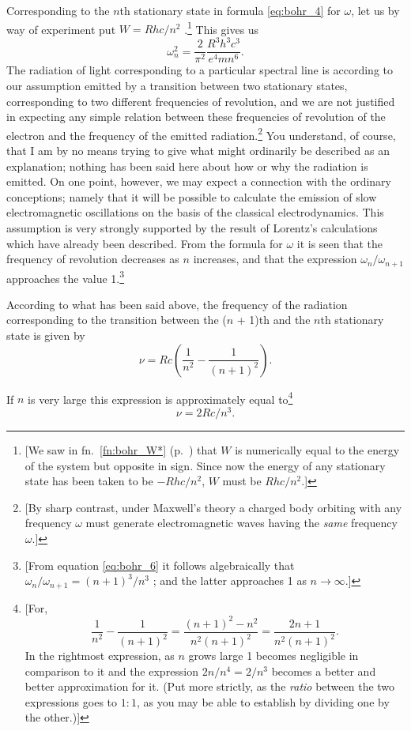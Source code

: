 Corresponding to the $n$th stationary state in formula \eqref{eq:bohr_4} for
$\omega$, let us by way of experiment put $W = Rhc/n^2$ .\footnote{\label{fn:bohr_W}{[}We saw in 
  fn.~\ref{fn:bohr_W*} (p.~\pageref{fn:bohr_W*}) that $W$ is
  numerically equal to the energy of the system but opposite in sign.
  Since now the energy of any stationary state has been taken to be
  $-Rhc/n^2$, $W$ must be $Rhc/n^2$.{]}} This gives us
%
\begin{equation}\label{eq:bohr_6}
\omega_n^2 = \frac{2}{\pi^2}\frac{R^3h^3c^3}{e^4mn^6}.
\end{equation}
%
The radiation of light corresponding to a particular spectral line is
according to our assumption emitted by a transition between two
stationary states, corresponding to two different frequencies of
revolution, and we are not justified in expecting any simple relation
between these frequencies of revolution of the electron and the
frequency of the emitted radiation.\footnote{{[}By sharp contrast, under
  Maxwell's theory a charged body orbiting with any frequency $\omega$
  must generate electromagnetic waves having the \emph{same} frequency
  $\omega$.{]}} You understand, of course, that I am by no means trying
to give what might ordinarily be described as an explanation; nothing
has been said here about how or why the radiation is emitted. On one
point, however, we may expect a connection with the ordinary
conceptions; namely that it will be possible to calculate the emission
of slow electromagnetic oscillations on the basis of the classical
electrodynamics. This assumption is very strongly supported by the
result of Lorentz's calculations which have already been described. From
the formula for $\omega$ it is seen that the frequency of revolution
decreases as $n$ increases, and that the expression
$\omega_n/\omega_{n+1}$ approaches the value 1.\footnote{{[}From equation
  \eqref{eq:bohr_6} it follows algebraically that $\omega_n/\omega_{n+1} =
  (n+1)^3/n^3$ ; and the latter approaches 1 as
  $n \rightarrow \infty$.{]}}

According to what has been said above, the frequency of the radiation
corresponding to the transition between the ($n$ + 1)th and the
$n$th stationary state is given by
\begin{equation*}
\nu = Rc\left(\frac{1}{n^2} - \frac{1}{(n+1)^2}\right) .
\end{equation*}

If $n$ is very large this expression is approximately equal to\footnote{[For, 
  \begin{equation*}
  \frac{1}{n^2} - \frac{1}{(n+1)^2} = \frac{(n+1)^2 - n^2}{n^2(n+1)^2} = \frac{2n+1}{n^2(n+1)^2} .
  \end{equation*}
  In the rightmost expression, as $n$ grows large 1 becomes
  negligible in comparison to it and the expression $2n/n^4 = 2/n^3$ 
  becomes a better and better approximation for it. (Put
  more strictly, as the \emph{ratio} between the two expressions goes to
  $1:1$, as you may be able to establish by dividing one by the other.)]}
\begin{equation*}
\nu = 2Rc/n^3 .
\end{equation*}

